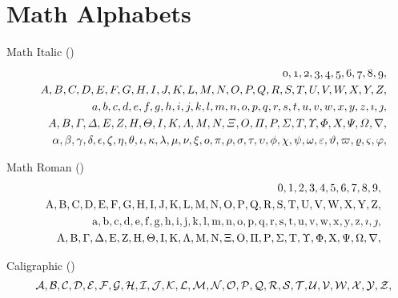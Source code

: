 \documentclass[fleqn]{article}
\def\test#1{#1}
\def\testnums{%
  \test 0 \test 1 \test 2 \test 3 \test 4 \test 5 \test 6 \test 7
  \test 8 \test 9 }
\def\testupperi{%
  \test A \test B \test C \test D \test E \test F \test G \test H
  \test I \test J \test K \test L \test M }
\def\testupperii{%
  \test N \test O \test P \test Q \test R \test S \test T \test U
  \test V \test W \test X \test Y \test Z }
\def\testupper{%
  \testupperi\testupperii}
\def\testloweri{%
  \test a \test b \test c \test d \test e \test f \test g \test h
  \test i \test j \test k \test l \test m }
\def\testlowerii{%
  \test n \test o \test p \test q \test r \test s \test t \test u
  \test v \test w \test x \test y \test z 
  \test\imath \test\jmath }
\def\testlower{%
  \testloweri\testlowerii}
\def\testupgreeki{%
  \test A \test B \test\Gamma \test\Delta \test E \test Z \test H
  \test\Theta \test I \test K \test\Lambda \test M }
\def\testupgreekii{%
  \test N \test\Xi \test O \test\Pi \test P \test\Sigma \test T
  \test\Upsilon \test\Phi \test X \test\Psi \test\Omega 
  \test\nabla }
\def\testupgreek{%
  \testupgreeki\testupgreekii}
\def\testlowgreeki{%
  \test\alpha \test\beta \test\gamma \test\delta \test\epsilon
  \test\zeta \test\eta \test\theta \test\iota \test\kappa \test\lambda
  \test\mu }
\def\testlowgreekii{%
  \test\nu \test\xi \test o \test\pi \test\rho \test\sigma \test\tau
  \test\upsilon \test\phi \test\chi \test\psi \test\omega }
\def\testlowgreekiii{%
  \test\varepsilon \test\vartheta \test\varpi \test\varrho
  \test\varsigma \test\varphi}
\def\testlowgreek{%
  \testlowgreeki\testlowgreekii\testlowgreekiii}
\begin{document}
\section{Math Alphabets}

Math Italic (\texttt{\string\mathnormal})
\def\test#1{\mathnormal{#1},}
\begin{eqnarray*}
  && {\testnums}\\
  && {\testupper}\\
  && {\testlower}\\ 
  && {\testupgreek}\\
  && {\testlowgreek}
\end{eqnarray*}%

Math Roman (\texttt{\string\mathrm})
\def\test#1{\mathrm{#1},}
\begin{eqnarray*}
  && {\testnums}\\
  && {\testupper}\\
  && {\testlower}\\ 
  && {\testupgreek}
\end{eqnarray*}%



Caligraphic (\texttt{\string\mathcal})
\def\test#1{\mathcal{#1},}
\begin{eqnarray*}
  && {\testupper}
\end{eqnarray*}%


\end{document}
